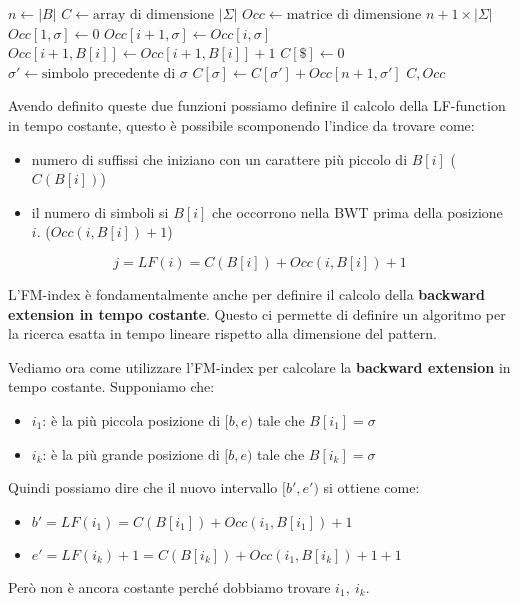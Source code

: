 \begin{algorithm}
    \begin{algorithmic}
        \State $n \gets |B|$
        \State $C \gets \text{array di dimensione } |\Sigma|$
        \State $Occ \gets \text{matrice di dimensione } n + 1 \times |\Sigma|$
        \For{$\sigma$}
        \State $Occ[1, \sigma] \gets 0$
        \EndFor
        \State $Occ[i + 1, \sigma] \gets Occ[i, \sigma]$
        \EndFor
        \State $Occ[i + 1, B[i]] \gets Occ[i + 1, B[i]] + 1$
        \EndFor
        \State $C[\$] \gets 0$
        \State $\sigma' \gets \text{simbolo precedente di } \sigma$
        \State $C[\sigma] \gets C[\sigma'] + Occ[n + 1, \sigma']$
        \EndFor
        \State \Return $C, Occ$
        \EndFunction
    \end{algorithmic}
\end{algorithm}

Avendo definito queste due funzioni possiamo definire il calcolo della LF-function
in tempo costante, questo è possibile scomponendo l'indice da trovare come:
\begin{itemize}
    \item numero di suffissi che iniziano con un carattere
    più piccolo di $B[i]$ ($C(B[i])$)
    \item il numero di simboli si $B[i]$ che occorrono nella
    BWT prima della posizione $i$. ($Occ(i, B[i]) + 1$)
\end{itemize} 

\begin{equation}
    j = LF(i) = C(B[i]) + Occ(i, B[i]) + 1
\end{equation}

L'FM-index è fondamentalmente anche per definire il calcolo della \textbf{backward extension in
tempo costante}. Questo ci permette di definire un algoritmo per la ricerca esatta
in tempo lineare rispetto alla dimensione del pattern.

Vediamo ora come utilizzare l'FM-index per calcolare la \textbf{backward
    extension} in tempo costante. Supponiamo che:
\begin{itemize}
    \item $i_1$: è la più piccola posizione di $[b,e)$ tale che $B[i_1]=\sigma$
    \item $i_k$: è la più grande posizione di $[b,e)$ tale che $B[i_k]=\sigma$
\end{itemize}
Quindi possiamo dire che il nuovo intervallo $[b',e')$ si ottiene come:
\begin{itemize}
    \item $b' = LF(i_1) = C(B[i_1]) + Occ(i_1,B[i_1])+1$
    \item $e' = LF(i_k) + 1 = C(B[i_k]) + Occ(i_1,B[i_k]) + 1 + 1$
\end{itemize}
Però non è ancora costante perché dobbiamo trovare $i_1, \ i_k$.

